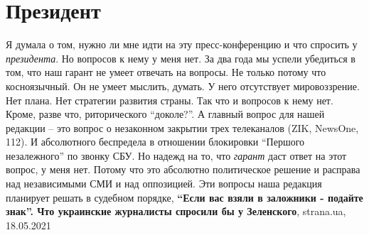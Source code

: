  
 
 
 
 
\chapter{Президент}

Я думала о том, нужно ли мне идти на эту пресс-конференцию и что спросить у
\emph{президента}. Но вопросов к нему у меня нет. За два года мы успели убедиться в
том, что наш гарант не умеет отвечать на вопросы. Не только потому что
косноязычный. Он не умеет мыслить, думать. У него отсутствует мировоззрение.
Нет плана. Нет стратегии развития страны. Так что и вопросов к нему нет. Кроме,
разве что, риторического \enquote{доколе?}.  А главный вопрос для нашей
редакции – это вопрос о незаконном закрытии трех телеканалов (ZIK, NewsOne,
112). И абсолютного беспредела в отношении блокировки \enquote{Першого
незалежного} по звонку СБУ. Но надежд на то, что \emph{гарант} даст ответ на этот
вопрос, у меня нет. Потому что это абсолютно политическое решение и расправа
над независимыми СМИ и над оппозицией. Эти вопросы наша редакция планирует
решать в судебном порядке,
\textbf{\enquote{Если вас взяли в заложники - подайте знак}. Что украинские журналисты спросили бы у Зеленского},
strana.ua, 18.05.2021

